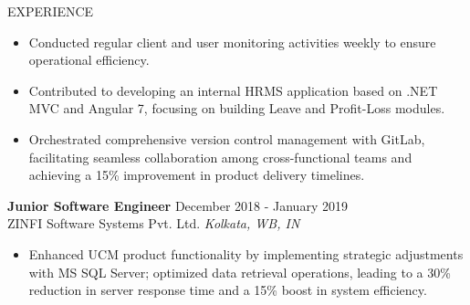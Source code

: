 \documentclass[11pt]{resume}
\begin{document}
\begin{rSection}{EXPERIENCE}
\begin{itemize}
            \item Conducted regular client and user monitoring activities weekly to ensure operational efficiency.
            \item Contributed to developing an internal HRMS application based on .NET MVC and Angular 7, focusing on building Leave and Profit-Loss modules.
            \item Orchestrated comprehensive version control management with GitLab, facilitating seamless collaboration among cross-functional teams and achieving a 15\% improvement in product delivery timelines.
        \end{itemize} \hfill \newline

        \textbf{Junior Software Engineer} \hfill December 2018 - January 2019\\
        ZINFI Software Systems Pvt. Ltd. \hfill \textit{Kolkata, WB, IN}
        \begin{itemize}
            \itemsep -3pt {}
            \item Enhanced UCM product functionality by implementing strategic adjustments with MS SQL Server; optimized data retrieval operations, leading to a 30\% reduction in server response time and a 15\% boost in system efficiency.
        \end{itemize} \hfill \newline

    \end{rSection}

\end{document}
